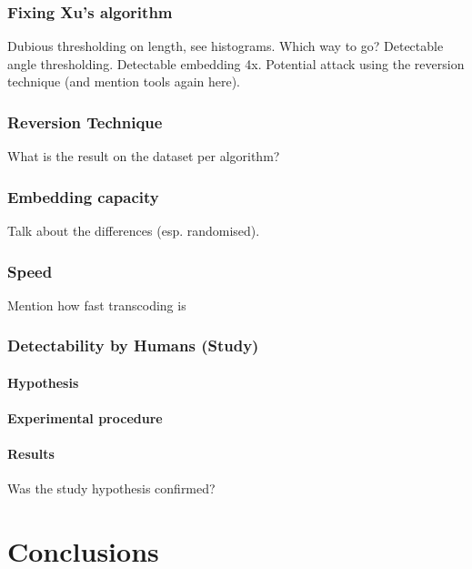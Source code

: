 \documentclass[12pt,british,twoside,notitlepage,usenames,dvipsnames,hypens,final]{report}
\numberwithin{equation}{section}
\numberwithin{figure}{section}
\begin{document}
\subsection{Fixing Xu's algorithm}

Dubious thresholding on length, see histograms. Which way to go?
Detectable angle thresholding.
Detectable embedding 4x.
Potential attack using the reversion technique (and mention tools again here).

\subsection{Reversion Technique}
\label{rev-tech}

What is the result on the dataset per algorithm?

\subsection{Embedding capacity}

Talk about the differences (esp. randomised).

\subsection{Speed}

Mention how fast transcoding is

\subsection{Detectability by Humans (Study)}

\subsubsection{Hypothesis}

\subsubsection{Experimental procedure}

\subsubsection{Results}

Was the study hypothesis confirmed?

\cleardoublepage
\chapter{Conclusions}
\end{document}

